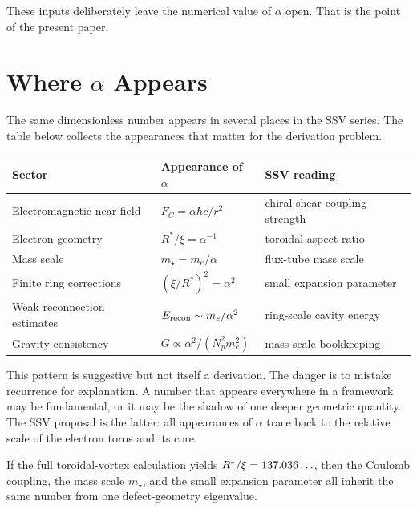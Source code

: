 \documentclass[11pt,a4paper]{article}
\begin{document}
These inputs deliberately leave the numerical value of $\alpha$ open.
That is the point of the present paper.

\section{Where \texorpdfstring{$\alpha$}{alpha} Appears}
\label{sec:appearances}

The same dimensionless number appears in several places in the SSV series.
The table below collects the appearances that matter for the derivation
problem.

\begin{center}
\renewcommand{\arraystretch}{1.35}
\begin{tabular}{lll}
\toprule
\textbf{Sector} & \textbf{Appearance of $\alpha$} & \textbf{SSV reading} \\
\midrule
Electromagnetic near field
  & $F_C=\alpha\hbar c/r^2$
  & chiral-shear coupling strength \\
Electron geometry
  & $R^*/\xi=\alpha^{-1}$
  & toroidal aspect ratio \\
Mass scale
  & $m_\star=m_e/\alpha$
  & flux-tube mass scale \\
Finite ring corrections
  & $(\xi/R^*)^2=\alpha^2$
  & small expansion parameter \\
Weak reconnection estimates
  & $E_{\rm recon}\sim m_e/\alpha^2$
  & ring-scale cavity energy \\
Gravity consistency
  & $G\propto \alpha^2/(N_p^2m_e^2)$
  & mass-scale bookkeeping \\
\bottomrule
\end{tabular}
\end{center}

This pattern is suggestive but not itself a derivation.  The danger is to
mistake recurrence for explanation.  A number that appears everywhere in a
framework may be fundamental, or it may be the shadow of one deeper
geometric quantity.  The SSV proposal is the latter: all appearances of
$\alpha$ trace back to the relative scale of the electron torus and its
core.

\begin{resultbox}[Reduction]
If the full toroidal-vortex calculation yields $R^*/\xi=137.036\ldots$,
then the Coulomb coupling, the mass scale $m_\star$, and the small expansion
parameter all inherit the same number from one defect-geometry eigenvalue.
\end{resultbox}
\end{document}
